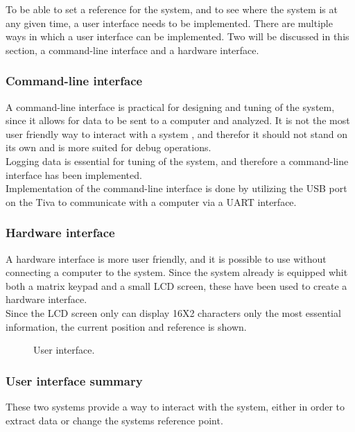 \documentclass[../../../main]{subfiles}
\begin{document}
To be able to set a reference for the system, and to see where the system is at any given time, a user interface needs to be implemented.
There are multiple ways in which a user interface can be implemented. 
Two will be discussed in this section, a command-line interface and a hardware interface.

\subsubsection{Command-line interface}%
\label{ssub:command-line_interface}
A command-line interface is practical for designing and tuning of the system, since it allows for data to be sent to a computer and analyzed.
It is not the most user friendly way to interact with a system , and therefor it should not stand on its own and is more suited for debug operations.
\\
Logging data is essential for tuning of the system, and therefore a command-line interface has been implemented. 
\\
Implementation of the command-line interface is done by utilizing the USB port on the Tiva to communicate with a computer via a UART interface.  

\subsubsection{Hardware interface}%
\label{ssub:hardware_interface}
A hardware interface is more user friendly, and it is possible to use without connecting a computer to the system. 
Since the system already is equipped whit both a matrix keypad and a small LCD screen, these have been used to create a hardware interface.
\\
Since the LCD screen only can display 16X2 characters only the most essential information, the current position and reference is shown.


\begin{figure}[H]
  \centering
  \def\svgwidth{\textwidth}
  
  \caption{User interface.}
  \label{fig:User_interface}
\end{figure}


\subsubsection{User interface summary}%
\label{ssub:user_interface_summary}

These two systems provide a way to interact with the system, either in order to extract data or change the systems reference point.
\end{document}

